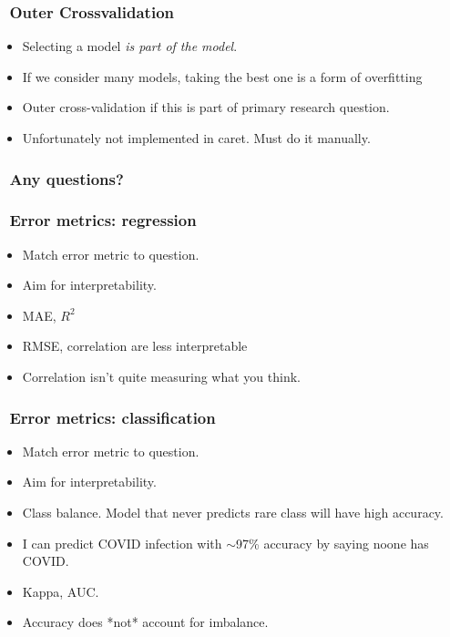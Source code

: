 \documentclass[handout, aspectratio = 169]{beamer}
\begin{document}
\begin{frame}
\frametitle{\insertframenumber~Outer Crossvalidation}

\begin{itemize}
\item Selecting a model \emph{is part of the model}.
\item If we consider many models, taking the best one is a form of overfitting
\item Outer cross-validation if this is part of primary research question.
\item Unfortunately not implemented in caret. Must do it manually.
\end{itemize}
\end{frame} 






\begin{frame}
\frametitle{\insertframenumber~Any questions?}


\end{frame} 




\begin{frame}
\frametitle{\insertframenumber~Error metrics: regression}

\begin{itemize}
\item Match error metric to question.
\item Aim for interpretability.
\item MAE, $R^2$
\item RMSE, correlation are less interpretable
\item Correlation isn't quite measuring what you think.
\end{itemize}
\end{frame} 


\begin{frame}
\frametitle{\insertframenumber~Error metrics: classification}

\begin{itemize}
\item Match error metric to question.
\item Aim for interpretability.
\item Class balance. Model that never predicts rare class will have high accuracy.
\item I can predict COVID infection with $\sim$97\% accuracy by saying noone has COVID. 
\item Kappa, AUC.
\item Accuracy does *not* account for imbalance.
\end{itemize}
\end{frame} 
\end{document}
